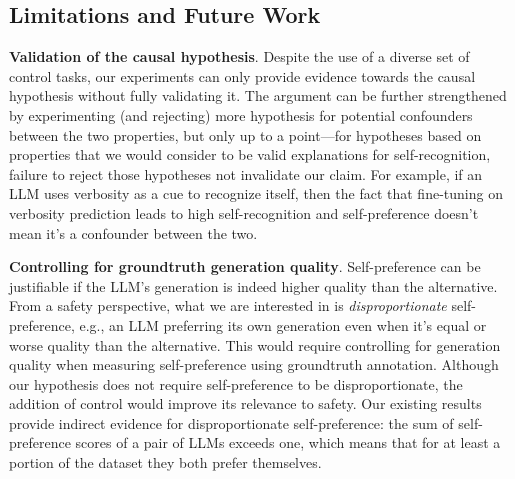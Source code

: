 \documentclass{article}
\theoremstyle{plain}
\theoremstyle{definition}
\theoremstyle{remark}
\begin{document}

\subsection{Limitations and Future Work}

\noindent\textbf{Validation of the causal hypothesis}.
Despite the use of a diverse set of control tasks, our experiments can only provide evidence towards the causal hypothesis without fully validating it. The argument can be further strengthened by experimenting (and rejecting) more hypothesis for potential confounders between the two properties, but only up to a point---for hypotheses based on properties that we would consider to be valid explanations for self-recognition, failure to reject those hypotheses not invalidate our claim.
For example, if an LLM uses verbosity as a cue to recognize itself, then the fact that fine-tuning on verbosity prediction leads to high self-recognition and self-preference doesn't mean it's a confounder between the two.

\noindent\textbf{Controlling for groundtruth generation quality}.
Self-preference can be justifiable if the LLM's generation is indeed higher quality than the alternative.
From a safety perspective, what we are interested in is \textit{disproportionate} self-preference, e.g., an LLM preferring its own generation even when it's equal or worse quality than the alternative.
This would require controlling for generation quality when measuring self-preference using groundtruth annotation.
Although our hypothesis does not require self-preference to be disproportionate, the addition of control would improve its relevance to safety.
Our existing results provide indirect evidence for disproportionate self-preference: the sum of self-preference scores of a pair of LLMs exceeds one, which means that for at least a portion of the dataset they both prefer themselves.
\end{document}
